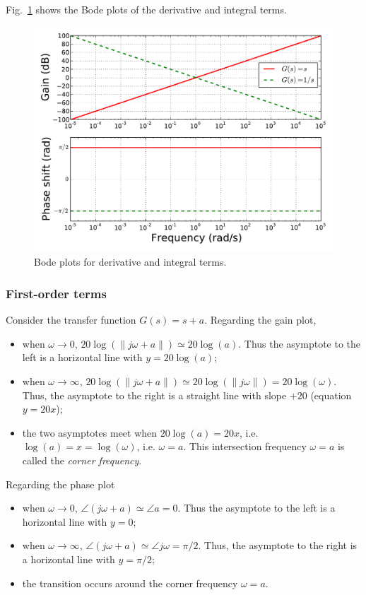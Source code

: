 \documentclass[a4paper,11pt]{report}
\theoremstyle{definition}
\begin{document}
Fig.~\ref{fig:bode-di} shows the Bode plots of the derivative and
integral terms.

\begin{figure}[H]
  \centering
  \includegraphics[width=12cm]{fig/bode-di.pdf}
  \caption{Bode plots for derivative and integral terms.}
  \label{fig:bode-di}
\end{figure}


\subsubsection{First-order terms}

Consider the transfer function $G(s)=s+a$. Regarding the gain plot,
\begin{itemize}
\item when $\omega\to 0$, $20\log(\|j\omega+a\|)\simeq
  20\log(a)$. Thus the asymptote to the left is a horizontal line
  with $y=20\log(a)$;
\item when $\omega\to\infty$, $20\log(\|j\omega+a\|)\simeq
  20\log(\|j\omega\|)=20\log(\omega)$. Thus, the asymptote to the
  right is a straight line with slope $+20$ (equation $y=20x$);
\item the two asymptotes meet when $20\log(a)=20x$,
  i.e. $\log(a)=x=\log(\omega)$, i.e. $\omega=a$. This intersection
  frequency $\omega=a$ is called the \emph{corner frequency}.
\end{itemize}

Regarding the phase plot
\begin{itemize}
\item when $\omega\to 0$, $\angle(j\omega+a) \simeq \angle a =
  0$. Thus the asymptote to the left is a horizontal line with $y=0$;
\item when $\omega\to\infty$, $\angle(j\omega+a) \simeq \angle j\omega
  = \pi/2$. Thus, the asymptote to the right is a horizontal line with
  $y=\pi/2$;
\item the transition occurs around the corner frequency $\omega=a$.
\end{itemize}
\end{document}
